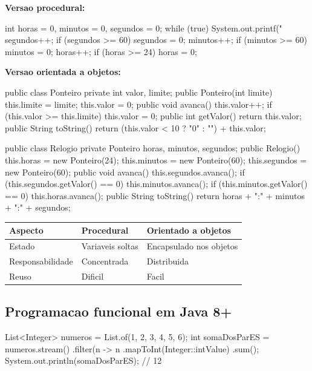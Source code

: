 \documentclass[11pt,a4paper]{article}
\begin{document}
\textbf{Versao procedural:}

\begin{javacode}
int horas = 0, minutos = 0, segundos = 0;
while (true) {
    System.out.printf("%
    segundos++;
    if (segundos >= 60) { segundos = 0; minutos++; }
    if (minutos >= 60)  { minutos = 0;  horas++;   }
    if (horas >= 24)    { horas = 0; }
}
\end{javacode}

\textbf{Versao orientada a objetos:}

\begin{javacode}
public class Ponteiro {
    private int valor, limite;
    public Ponteiro(int limite) { this.limite = limite; this.valor = 0; }
    public void avanca() { this.valor++; if (this.valor >= this.limite) this.valor = 0; }
    public int getValor() { return this.valor; }
    public String toString() { return (this.valor < 10 ? "0" : "") + this.valor; }
}

public class Relogio {
    private Ponteiro horas, minutos, segundos;
    public Relogio() {
        this.horas = new Ponteiro(24);
        this.minutos = new Ponteiro(60);
        this.segundos = new Ponteiro(60);
    }
    public void avanca() {
        this.segundos.avanca();
        if (this.segundos.getValor() == 0) {
            this.minutos.avanca();
            if (this.minutos.getValor() == 0) this.horas.avanca();
        }
    }
    public String toString() { return horas + ":" + minutos + ":" + segundos; }
}
\end{javacode}

\begin{center}
\begin{tabular}{l l l}
\toprule
\textbf{Aspecto} & \textbf{Procedural} & \textbf{Orientado a objetos} \\
\midrule
Estado & Variaveis soltas & Encapsulado nos objetos \\
Responsabilidade & Concentrada & Distribuida \\
Reuso & Dificil & Facil \\
\bottomrule
\end{tabular}
\end{center}

\subsection{Programacao funcional em Java 8+}

\begin{javacode}
List<Integer> numeros = List.of(1, 2, 3, 4, 5, 6);
int somaDosParES = numeros.stream()
    .filter(n -> n %
    .mapToInt(Integer::intValue)
    .sum();
System.out.println(somaDosParES); // 12
\end{javacode}
\end{document}
